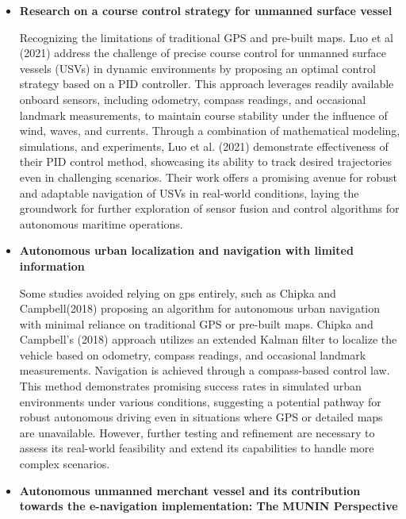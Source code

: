\begin{itemize}
\item {\bf Research on a course control strategy for unmanned surface vessel \cite{Luo_2021}} 

Recognizing the limitations of traditional GPS and pre-built maps. Luo et al (2021) address the challenge of precise 
course control for unmanned surface vessels (USVs) in dynamic environments by proposing an optimal control strategy 
based on a PID controller. This approach leverages readily available onboard sensors, including odometry, compass 
readings, and occasional landmark measurements, to maintain course stability under the influence of wind, waves, and 
currents. Through a combination of mathematical modeling, simulations, and experiments, Luo et al. (2021) demonstrate 
effectiveness of their PID control method, showcasing its ability to track desired trajectories even in challenging 
scenarios. Their work offers a promising avenue for robust and adaptable navigation of USVs in real-world conditions, 
laying the groundwork for further exploration of sensor fusion and control algorithms for autonomous maritime operations.

\item {\bf Autonomous urban localization and navigation with limited information \cite{DBLP:journals/corr/abs-1810-04243}} 

Some studies avoided relying on gps entirely, such as Chipka and Campbell(2018) proposing an algorithm for autonomous 
urban navigation with minimal reliance on traditional GPS or pre-built maps. Chipka and Campbell's (2018) approach 
utilizes an extended Kalman filter to localize the vehicle based on odometry, compass readings, and occasional landmark 
measurements. Navigation is achieved through a compass-based control law. This method demonstrates promising success 
rates in simulated urban environments under various conditions, suggesting a potential pathway for robust autonomous 
driving even in situations where GPS or detailed maps are unavailable. However, further testing and refinement are 
necessary to assess its real-world feasibility and extend its capabilities to handle more complex scenarios.


\item {\bf Autonomous unmanned merchant vessel and its contribution towards the e-navigation implementation: The MUNIN Perspective \cite{BURMEISTER20141}} 


\end{itemize}
